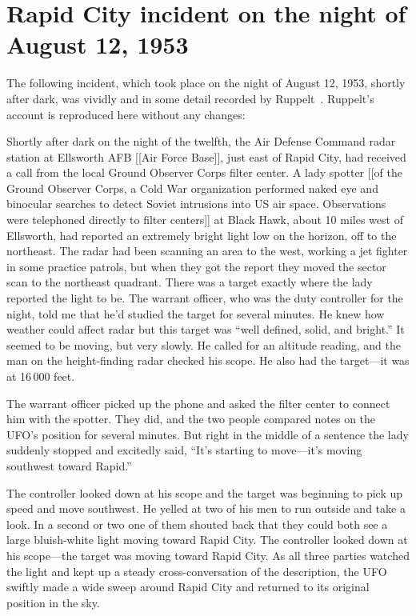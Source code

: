 \section{Rapid City incident on the night of August 12, 1953}
\label{2023-UFO-part-History-chapter-post-1945-pre-1953-RC53}

The following incident, which took place on the night of August 12, 1953, shortly after dark, was vividly and in some detail recorded by
Ruppelt~\cite{Ruppelt2011May}. Ruppelt's account is reproduced here without any changes:
\begin{svgraybox}
Shortly after dark on the night of the twelfth, the Air Defense
Command radar station at Ellsworth AFB [[Air Force Base]], just east of Rapid City, had
received a call from the local Ground Observer Corps filter center. A
lady spotter [[of the Ground Observer Corps, a Cold War organization performed naked eye and binocular searches to detect Soviet intrusions into US air space. Observations were telephoned directly to filter centers]]
at Black Hawk, about 10 miles west of Ellsworth, had
reported an extremely bright light low on the horizon, off to the
northeast. The radar had been scanning an area to the west, working a
jet fighter in some practice patrols, but when they got the report
they moved the sector scan to the northeast quadrant. There was a
target exactly where the lady reported the light to be. The warrant
officer, who was the duty controller for the night, told me that he'd
studied the target for several minutes. He knew how weather could
affect radar but this target was ``well defined, solid, and bright.''
It seemed to be moving, but very slowly. He called for an altitude
reading, and the man on the height-finding radar checked his scope.
He also had the target---it was at 16\,000 feet.

The warrant officer picked up the phone and asked the filter center
to connect him with the spotter. They did, and the two people
compared notes on the UFO's position for several minutes. But right
in the middle of a sentence the lady suddenly stopped and excitedly
said, ``It's starting to move---it's moving southwest toward Rapid.''

The controller looked down at his scope and the target was beginning
to pick up speed and move southwest. He yelled at two of his men to
run outside and take a look. In a second or two one of them shouted
back that they could both see a large bluish-white light moving
toward Rapid City. The controller looked down at his scope---the
target was moving toward Rapid City. As all three parties watched the
light and kept up a steady cross-conversation of the description, the
UFO swiftly made a wide sweep around Rapid City and returned to its
original position in the sky.


\end{svgraybox}
